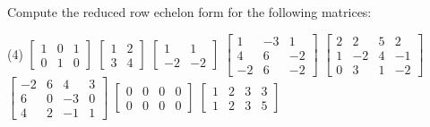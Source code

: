 \setcounter{exercise}{100}

\begin{exercise}
Compute the reduced row echelon form for the following matrices:
\begin{tasks}(4)
\task
$\begin{bmatrix}
1 & 0 & 1 \\
0 & 1 & 0
\end{bmatrix}$
\task
$\begin{bmatrix}
1 & 2 \\
3 & 4
\end{bmatrix}$
\task
$\begin{bmatrix}
1 & 1 \\
-2 & -2
\end{bmatrix}$
\task
$\begin{bmatrix}
1 & -3 & 1 \\
4 & 6 & -2 \\
-2 & 6 & -2
\end{bmatrix}$
\task
$\begin{bmatrix}
2 & 2 & 5 & 2 \\
1 & -2 & 4 & -1 \\
0 & 3 & 1 & -2
\end{bmatrix}$
\task
$\begin{bmatrix}
-2 & 6 & 4 & 3 \\
6 & 0 & -3 & 0 \\
4 & 2 & -1 & 1
\end{bmatrix}$
\task
$\begin{bmatrix}
0 & 0 & 0 & 0 \\
0 & 0 & 0 & 0
\end{bmatrix}$
\task
$\begin{bmatrix}
1 & 2 & 3 & 3 \\
1 & 2 & 3 & 5
\end{bmatrix}$
\end{tasks}
\end{exercise}
